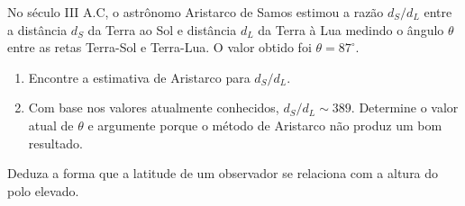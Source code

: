\begin{prob}
	No século III A.C, o astrônomo Aristarco de Samos estimou a razão $d_{S}/d_{L}$ entre a distância $d_{S}$ da Terra ao Sol e distância $d_{L}$ da Terra à Lua medindo o ângulo $\theta$ entre as retas Terra-Sol e Terra-Lua. O valor obtido foi $\theta=87^{\circ}$.
	\begin{enumerate}[label=\alph *)]
		\item Encontre a estimativa de Aristarco para $d_{S}/d_{L}$.
		\item Com base nos valores atualmente conhecidos, $d_{S}/d_{L}\sim 389$. Determine o valor atual de $\theta$ e argumente porque o método de Aristarco não produz um bom resultado.
	\end{enumerate}
\end{prob}
\begin{prob}
	Deduza a forma que a latitude de um observador se relaciona com a altura do polo elevado.
\end{prob}
